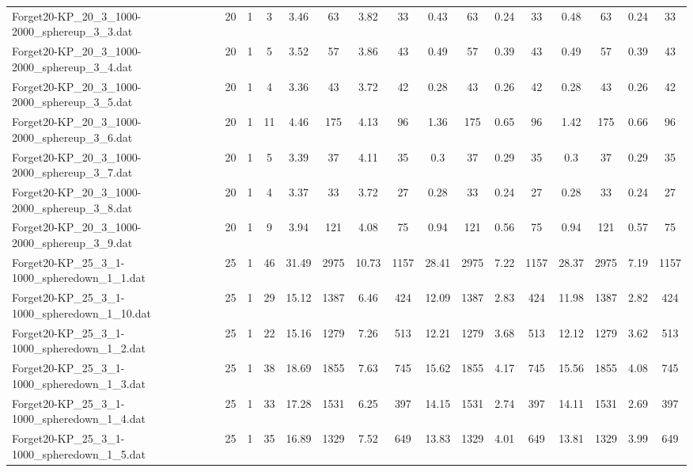 \begin{sidewaystable}[!ht]
{\begin{tabular}{lccccccccccccccc}
Forget20-KP\_20\_3\_1000-2000\_sphereup\_3\_3.dat & 20 & 1 & 3 & 3.46 & 63 & 3.82 & 33 & 0.43 & 63 &  \textcolor{blue2}{0.24} & 33 & 0.48 & 63 &  \textcolor{blue2}{0.24} & 33 \\
Forget20-KP\_20\_3\_1000-2000\_sphereup\_3\_4.dat & 20 & 1 & 5 & 3.52 & 57 & 3.86 & 43 & 0.49 & 57 &  \textcolor{blue2}{0.39} & 43 & 0.49 & 57 &  \textcolor{blue2}{0.39} & 43 \\
Forget20-KP\_20\_3\_1000-2000\_sphereup\_3\_5.dat & 20 & 1 & 4 & 3.36 & 43 & 3.72 & 42 & 0.28 & 43 &  \textcolor{blue2}{0.26} & 42 & 0.28 & 43 &  \textcolor{blue2}{0.26} & 42 \\
Forget20-KP\_20\_3\_1000-2000\_sphereup\_3\_6.dat & 20 & 1 & 11 & 4.46 & 175 & 4.13 & 96 & 1.36 & 175 &  \textcolor{blue2}{0.65} & 96 & 1.42 & 175 & 0.66 & 96 \\
Forget20-KP\_20\_3\_1000-2000\_sphereup\_3\_7.dat & 20 & 1 & 5 & 3.39 & 37 & 4.11 & 35 & 0.3 & 37 &  \textcolor{blue2}{0.29} & 35 & 0.3 & 37 &  \textcolor{blue2}{0.29} & 35 \\
Forget20-KP\_20\_3\_1000-2000\_sphereup\_3\_8.dat & 20 & 1 & 4 & 3.37 & 33 & 3.72 & 27 & 0.28 & 33 &  \textcolor{blue2}{0.24} & 27 & 0.28 & 33 &  \textcolor{blue2}{0.24} & 27 \\
Forget20-KP\_20\_3\_1000-2000\_sphereup\_3\_9.dat & 20 & 1 & 9 & 3.94 & 121 & 4.08 & 75 & 0.94 & 121 &  \textcolor{blue2}{0.56} & 75 & 0.94 & 121 & 0.57 & 75 \\
Forget20-KP\_25\_3\_1-1000\_spheredown\_1\_1.dat & 25 & 1 & 46 & 31.49 & 2975 & 10.73 & 1157 & 28.41 & 2975 & 7.22 & 1157 & 28.37 & 2975 & 7.19 & 1157 \\
Forget20-KP\_25\_3\_1-1000\_spheredown\_1\_10.dat & 25 & 1 & 29 & 15.12 & 1387 & 6.46 & 424 & 12.09 & 1387 & 2.83 & 424 & 11.98 & 1387 & 2.82 & 424 \\
Forget20-KP\_25\_3\_1-1000\_spheredown\_1\_2.dat & 25 & 1 & 22 & 15.16 & 1279 & 7.26 & 513 & 12.21 & 1279 & 3.68 & 513 & 12.12 & 1279 & 3.62 & 513 \\
Forget20-KP\_25\_3\_1-1000\_spheredown\_1\_3.dat & 25 & 1 & 38 & 18.69 & 1855 & 7.63 & 745 & 15.62 & 1855 & 4.17 & 745 & 15.56 & 1855 &  \textcolor{blue2}{4.08} & 745 \\
Forget20-KP\_25\_3\_1-1000\_spheredown\_1\_4.dat & 25 & 1 & 33 & 17.28 & 1531 & 6.25 & 397 & 14.15 & 1531 & 2.74 & 397 & 14.11 & 1531 & 2.69 & 397 \\
Forget20-KP\_25\_3\_1-1000\_spheredown\_1\_5.dat & 25 & 1 & 35 & 16.89 & 1329 & 7.52 & 649 & 13.83 & 1329 & 4.01 & 649 & 13.81 & 1329 & 3.99 & 649 \\

\end{tabular}}
\end{sidewaystable}
